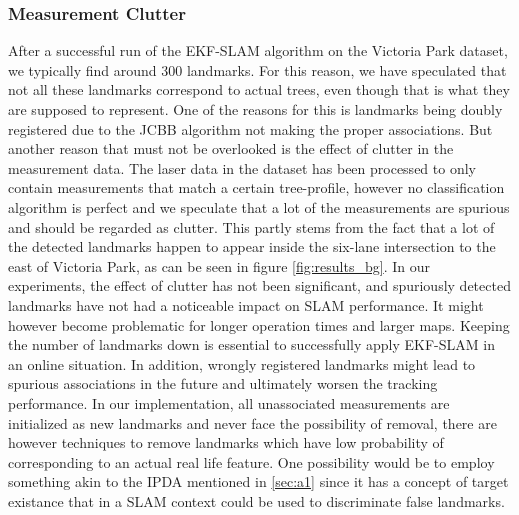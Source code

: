\subsubsection{Measurement Clutter}
After a successful run of the EKF-SLAM algorithm on the Victoria Park dataset, we typically find around 300 landmarks. For this reason, we have speculated that not all these landmarks correspond to actual trees, even though that is what they are supposed to represent. One of the reasons for this is landmarks being doubly registered due to the JCBB algorithm not making the proper associations. But another reason that must not be overlooked is the effect of clutter in the measurement data. The laser data in the dataset has been processed to only contain measurements that match a certain tree-profile\cite{victoria}, however no classification algorithm is perfect and we speculate that a lot of the measurements are spurious and should be regarded as clutter. This partly stems from the fact that a lot of the detected landmarks happen to appear inside the six-lane intersection to the east of Victoria Park, as can be seen in figure \ref{fig:results_bg}. In our experiments, the effect of clutter has not been significant, and spuriously detected landmarks have not had a noticeable impact on SLAM performance. It might however become problematic for longer operation times and larger maps. Keeping the number of landmarks down is essential to successfully apply EKF-SLAM in an online situation. In addition, wrongly registered landmarks might lead to spurious associations in the future and ultimately worsen the tracking performance. In our implementation, all unassociated measurements are initialized as new landmarks and never face the possibility of removal, there are however techniques to remove landmarks which have low probability of corresponding to an actual real life feature. One possibility would be to employ something akin to the IPDA mentioned in \ref{sec:a1} since it has a concept of target existance that in a SLAM context could be used to discriminate false landmarks.

